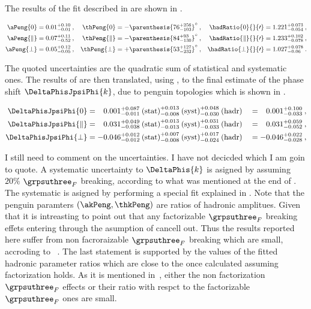 The results of the \chisq fit described in  are shown in .

\begin{subequations}
\label{peng_a_theta_results}
\begin{align}
    \aPeng{0}         & = 0.01^{+0.10}_{-0.01}\:, & \thPeng{0}         & = -\parenthesis{76^{+256}_{-103}}^\circ\:, & \hadRatio{0}{}{\prime}         = 1.221^{+0.073}_{-0.054}\:,\\
    \aPeng{\parallel} & = 0.07^{+0.11}_{-0.52}\:, & \thPeng{\parallel} & = -\parenthesis{84^{+93}_{-130}}^\circ\:,  & \hadRatio{\parallel}{}{\prime} = 1.233^{+0.102}_{-0.078}\:,\\
    \aPeng{\perp}     & = 0.05^{+0.12}_{-0.05}\:, & \thPeng{\perp}     & = +\parenthesis{53^{+127}_{-232}}^\circ\:, & \hadRatio{\perp}{}{\prime}     = 1.027^{+0.078}_{-0.06}\:.
\end{align}
\end{subequations}

\noindent The quoted uncertainties are the quadratic sum of statistical and systematic ones.
The results of  are then translated, using ,
to the final estimate of the phase shift $\DeltaPhisJpsiPhi{k}$, due to penguin topologies which is shown in .

\begin{alignat}{2}
\DeltaPhisJpsiPhi{0} & =
\phantom{-}0.001^{+0.087}_{-0.011}\:\text{(stat)}^{+0.013}_{-0.008}\:\text{(syst)}^{+0.048}_{-0.030}\:(\text{hadr})
&& = \phantom{-}0.001^{+0.100}_{-0.033}\:,\\
%
\DeltaPhisJpsiPhi{\parallel} & =
\phantom{-}0.031^{+0.049}_{-0.038}\:\text{(stat)}^{+0.013}_{-0.013}\:\text{(syst)}^{+0.031}_{-0.033}\:(\text{hadr})
&& = \phantom{-}0.031^{+0.059}_{-0.052}\:,\\
%
\DeltaPhisJpsiPhi{\perp} & =
-0.046^{+0.012}_{-0.012}\:\text{(stat)}^{+0.007}_{-0.008}\:\text{(syst)}^{+0.017}_{-0.024}\:(\text{hadr})
&& = -0.046^{+0.022}_{-0.028}\:,
\label{delta_phis_result}
\end{alignat}

{\color{red} I still need to comment on the uncertainties. I have not decicded which I am goin to quote.}
A systematic uncertainty to $\DeltaPhis{k}$ is asigned by assuming $20\%$ $\grpsuthree_F$ breaking,
according to what was mentioned at the end of . The systematic is asigned
by performing a special fit explained in . Note that the penguin paramters
$(\akPeng,\thkPeng)$ are ratios of hadronic amplitues. Given that it is
intreasting to point out that any factorizable $\grpsuthree_F$ breaking effets entering through the asumption
of  cancell out.
Thus the results reported here suffer from non facroraizable $\grpsuthree_F$ breaking which are small,
accroding to ~\cite{DeBruyn-thesis}. The last statement is supported by the values of the fitted hadronic parameter
ratios which are close to the once calculated assuming factorization holds. As it is mentioned in~\cite{DeBruyn-thesis},
either the non factorization $\grpsuthree_F$ effects or their ratio with respct to the factorizable $\grpsuthree_F$
ones are small.

